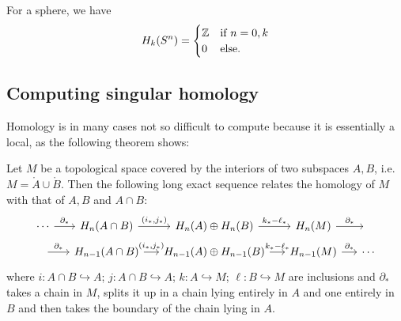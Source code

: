 \begin{eg}
    For a sphere, we have
    \[
        H_k(S^{n}) = \begin{cases}
            \mathbb{Z} & \text{if $n = 0, k$}\\
            0 & \text{else.}
        \end{cases}
    \] 
\end{eg}

\subsection*{Computing singular homology}

Homology is in many cases not so difficult to compute because it is essentially a local, as the following theorem shows:
\begin{theorem}
    Let $M$ be a topological space covered by the interiors of two subspaces  $A, B$, i.e.\ $M = \mathring A \cup \mathring B$.
    Then the following long exact sequence relates the homology of $M$ with that of  $A, B$ and  $A \cap B$:
    \[
        \begin{tikzcd}[column sep=1.4em, row sep=0.6em]
            \cdots \arrow[r, "\partial_*"]&
            H_n(A \cap B) \arrow[r, "{(i_*, j_*)}"] &
            H_n(A) \oplus H_n(B) \arrow[r, "k_* - \ell_*"] &
            H_{n}(M) \arrow[r, "\partial_*"] & {}\\
            \arrow[r, "\partial_*"]&
            H_{n-1}(A \cap B) \arrow[r, "{(i_*, j_*)}"] &
            H_{n-1}(A) \oplus H_{n-1}(B) \arrow[r, "k_* - \ell_*"] &
            H_{n-1}(M) \arrow[r, "\partial_*"] & \cdots
        \end{tikzcd}
    \]
    where $i: A \cap  B \hookrightarrow A$; $j: A \cap B \hookrightarrow A$; $k: A \hookrightarrow M$;  $\ell: B \hookrightarrow M$ are inclusions and $\partial_*$ takes a chain in $M$, splits it up in a chain lying entirely in $A$ and one entirely in $B$ and then  takes the boundary of the chain lying in $A$.
\end{theorem}
